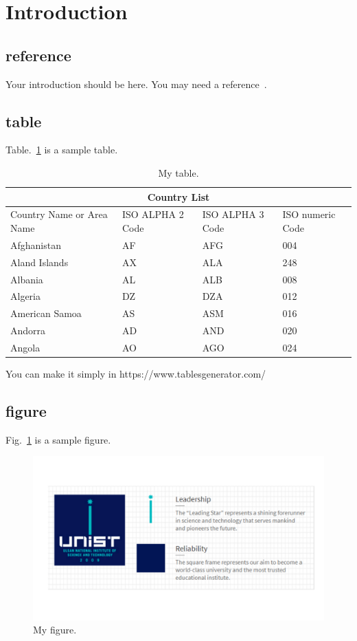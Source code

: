 \section{Introduction} 

\subsection{reference}
Your introduction should be here. You may need a reference~\cite{Lee:2018}.

\subsection{table}
Table.~\ref{tab:mytable} is a sample table. 

\begin{table}[h]
\centering
\begin{tabular}{ |p{3cm}||p{3cm}|p{3cm}|p{3cm}|  }
 \hline
 \multicolumn{4}{|c|}{Country List} \\
 \hline
 Country Name     or Area Name& ISO ALPHA 2 Code &ISO ALPHA 3 Code&ISO numeric Code\\
 \hline
 Afghanistan   & AF    &AFG&   004\\
 Aland Islands&   AX  & ALA   &248\\
 Albania &AL & ALB&  008\\
 Algeria    &DZ & DZA&  012\\
 American Samoa&   AS  & ASM&016\\
 Andorra& AD  & AND   &020\\
 Angola& AO  & AGO&024\\
 \hline
\end{tabular}
\caption{My table.} \label{tab:mytable}
\end{table}

You can make it simply in https://www.tablesgenerator.com/

\subsection{figure}

Fig.~\ref{fig:myfigure} is a sample figure. 

\begin{figure}[h]
\centering
\includegraphics[width=5in]{figures/myfigure.pdf}
\caption{My figure.} \label{fig:myfigure}
\end{figure}

